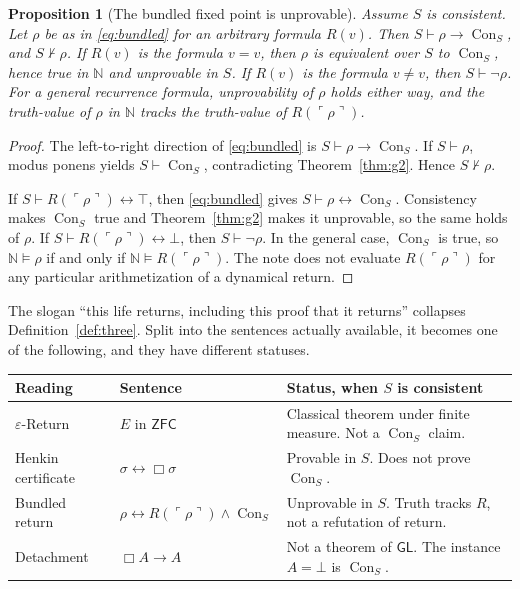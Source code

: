 \documentclass[11pt]{article}
\newcommand{\Nat}{\mathbb{N}}
\newcommand{\gn}[1]{\ulcorner #1 \urcorner}
\DeclareMathOperator{\Con}{Con}
\newcommand{\ZFC}{\mathsf{ZFC}}
\newcommand{\GL}{\mathsf{GL}}
\newtheorem{proposition}[theorem]{Proposition}
\theoremstyle{definition}
\theoremstyle{remark}
\begin{document}
\begin{proposition}[The bundled fixed point is unprovable]
\label{prop:bundled}
Assume \(S\) is consistent.
Let \(\rho\) be as in \eqref{eq:bundled} for an arbitrary formula \(R(v)\).
Then \(S\vdash\rho\to\Con_{S}\), and \(S\nvdash\rho\).
If \(R(v)\) is the formula \(v=v\), then \(\rho\) is equivalent over \(S\) to \(\Con_{S}\), hence true in \(\Nat\) and unprovable in \(S\).
If \(R(v)\) is the formula \(v\neq v\), then \(S\vdash\neg\rho\).
For a general recurrence formula, unprovability of \(\rho\) holds either way, and the truth-value of \(\rho\) in \(\Nat\) tracks the truth-value of \(R(\gn{\rho})\).
\end{proposition}

\begin{proof}
The left-to-right direction of \eqref{eq:bundled} is \(S\vdash\rho\to\Con_{S}\).
If \(S\vdash\rho\), modus ponens yields \(S\vdash\Con_{S}\), contradicting Theorem~\ref{thm:g2}.
Hence \(S\nvdash\rho\).

If \(S\vdash R(\gn{\rho})\leftrightarrow \top\), then \eqref{eq:bundled} gives \(S\vdash\rho\leftrightarrow\Con_{S}\).
Consistency makes \(\Con_{S}\) true and Theorem~\ref{thm:g2} makes it unprovable, so the same holds of \(\rho\).
If \(S\vdash R(\gn{\rho})\leftrightarrow \bot\), then \(S\vdash\neg\rho\).
In the general case, \(\Con_{S}\) is true, so \(\Nat\models\rho\) if and only if \(\Nat\models R(\gn{\rho})\).
The note does not evaluate \(R(\gn{\rho})\) for any particular arithmetization of a dynamical return.
\end{proof}

The slogan ``this life returns, including this proof that it returns'' collapses Definition~\ref{def:three}.
Split into the sentences actually available, it becomes one of the following, and they have different statuses.

\begin{center}
\begin{tabular}{@{}llp{6.4cm}@{}}
\toprule
Reading & Sentence & Status, when \(S\) is consistent \\
\midrule
\(\varepsilon\)-Return & \(E\) in \(\ZFC\) & Classical theorem under finite measure. Not a \(\Con_{S}\) claim. \\
Henkin certificate & \(\sigma\leftrightarrow\Box\sigma\) & Provable in \(S\). Does not prove \(\Con_{S}\). \\
Bundled return & \(\rho\leftrightarrow R(\gn{\rho})\wedge\Con_{S}\) & Unprovable in \(S\). Truth tracks \(R\), not a refutation of return. \\
Detachment & \(\Box A\to A\) & Not a theorem of \(\GL\). The instance \(A=\bot\) is \(\Con_{S}\). \\
\bottomrule
\end{tabular}
\end{center}
\end{document}
